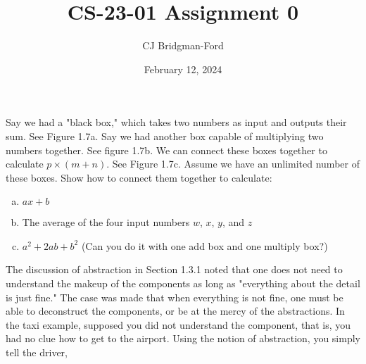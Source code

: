 \documentclass{report}
\title{CS-23-01 Assignment 0}
\author{CJ Bridgman-Ford}
\date{February 12, 2024}
\newcommand{\pagenumber}{\thepage\quad}
\newcommand{\authorname}{CJ Bridgman-Ford}
\begin{document}
\pagestyle{fancy}
\renewcommand{\headrulewidth}{0pt}
\fancyfoot[L]{\authorname}
\fancyfoot[C]{}
\fancyfoot[R]{\pagenumber}


\maketitle



\begin{center}
\parbox{11.325cm}{
\begin{flushleft}
{Say we had a "black box," which takes two numbers as input and outputs their sum. See Figure 1.7a. Say we had another box capable of multiplying two numbers together. See figure 1.7b. We can connect these boxes together to calculate \(p \times (m + n )\). See Figure 1.7c. Assume we have an unlimited number of these boxes. Show how to connect them together to calculate:}
\end{flushleft}
\begin{enumerate}[(a)]
    \item{\(ax+b\)}
    \item{The average of the four input numbers \(w\), \(x\), \(y\), and \(z\)}
    \item{\(a^2+2ab+b^2\) (Can you do it with one add box and one multiply box?)}
\end{enumerate}
}

\vspace{5cm}

\parbox{11.325cm}{
\begin{flushleft}
{The discussion of abstraction in Section 1.3.1 noted that one does not need to understand the makeup of the components as long as "everything about the detail is just fine." The case was made that when everything is not fine, one must be able to deconstruct the components, or be at the mercy of the abstractions. In the taxi example, supposed you did not understand the component, that is, you had no clue how to get to the airport. Using the notion of abstraction, you simply tell the driver,}
\end{flushleft}
}

\end{center}
\end{document}
